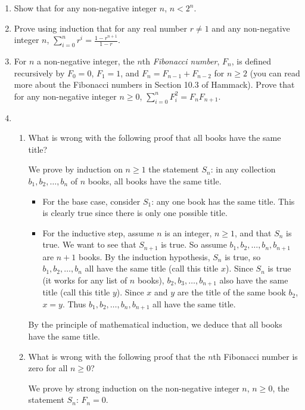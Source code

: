 \documentclass{amsart}
\theoremstyle{definition}
\begin{document}
\begin{enumerate}
\item Show that for any non-negative integer $n$, $n < 2^n$.
\item Prove using induction that for any real number $r \neq 1$ and any non-negative integer $n$, $\sum_{i = 0}^n r^i = \frac{1 - r^{n + 1}}{1 - r}$.
\item For $n$ a non-negative integer, the $n$th \emph{Fibonacci number}, $F_n$, is defined recursively by $F_0 = 0$, $F_1 = 1$, and $F_n = F_{n - 1} + F_{n - 2}$ for $n \ge 2$ (you can read more about the Fibonacci numbers in Section 10.3 of Hammack). Prove that for any non-negative integer $n \ge 0$, $\sum_{i = 0}^n F_i^2 = F_n F_{n + 1}$.

\item 
  \begin{enumerate}
  \item What is wrong with the following proof that all books have the same title?

    We prove by induction on $n \ge 1$ the statement $S_n$: in any collection $b_1, b_2, \ldots, b_n$ of $n$ books, all books have the same title.

    \begin{itemize}
    \item For the base case, consider $S_1$: any one book has the same title. This is clearly true since there is only one possible title.
    \item For the inductive step, assume $n$ is an integer, $n \ge 1$, and that $S_n$ is true. We want to see that $S_{n + 1}$ is true. So assume $b_1, b_2, \ldots, b_n, b_{n + 1}$ are $n + 1$ books. By the induction hypothesis, $S_n$ is true, so $b_1, b_2, \ldots, b_n$ all have the same title (call this title $x$). Since $S_n$ is true (it works for any list of $n$ books), $b_2, b_3, \ldots, b_{n + 1}$ also have the same title (call this title $y$). Since $x$ and $y$ are the title of the same book $b_2$, $x = y$. Thus $b_1, b_2, \ldots, b_n, b_{n + 1}$ all have the same title.
    \end{itemize}

    By the principle of mathematical induction, we deduce that all books have the same title.
    
  \item What is wrong with the following proof that the $n$th Fibonacci number is zero for all $n \ge 0$?

    We prove by strong induction on the non-negative integer $n$, $n \ge 0$, the statement $S_n$: $F_n = 0$.


\end{enumerate}
\end{enumerate}
\end{document}
